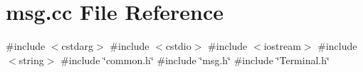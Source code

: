 \section{msg.\+cc File Reference}
\label{msg_8cc}
{\ttfamily \#include $<$cstdarg$>$}\newline
{\ttfamily \#include $<$cstdio$>$}\newline
{\ttfamily \#include $<$iostream$>$}\newline
{\ttfamily \#include $<$string$>$}\newline
{\ttfamily \#include \char`\"{}common.\+h\char`\"{}}\newline
{\ttfamily \#include \char`\"{}msg.\+h\char`\"{}}\newline
{\ttfamily \#include \char`\"{}Terminal.\+h\char`\"{}}\newline
